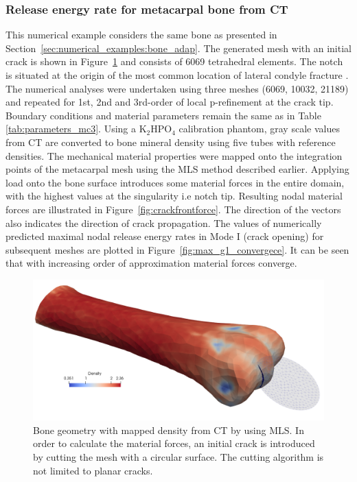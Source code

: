 \documentclass[11pt]{acmeArticle}
\numberwithin{equation}{section}
\begin{document}
\subsubsection{Release energy rate for metacarpal bone from CT}
This numerical example considers the same bone as presented in Section~\ref{sec:numerical_examples:bone_adap}. 
The generated mesh with an initial crack is shown in Figure~\ref{fig:bone_ct_mesh_cut} and consists of 6069 tetrahedral elements. 
The notch is situated at the origin of the most common location of lateral condyle fracture \citep{jacklin2012frequency}. 
The numerical analyses were undertaken using three meshes (6069, 10032, 21189) and repeated for 1st, 2nd and 3rd-order of local p-refinement at the crack tip. 
Boundary conditions and material parameters remain the same as in Table \ref{tab:parameters_mc3}. Using a $ \mathrm {K_2 HPO_4  }$ calibration phantom, gray scale values from CT are converted to bone mineral density using five tubes with reference densities. 
The mechanical material properties were mapped onto the integration points of the metacarpal mesh using the MLS method described earlier. 
Applying load onto the bone surface introduces some material forces in the entire domain, with the highest values at the singularity i.e notch tip. 
Resulting nodal material forces are illustrated in Figure~\ref{fig:crackfrontforce}. 
The direction of the vectors also indicates the direction of crack propagation.
The values of numerically predicted maximal nodal release energy rates in Mode I (crack opening) for subsequent meshes are plotted in Figure~\ref{fig:max_g1_convergece}. 
It can be seen that with increasing order of approximation material forces converge.
\begin{figure}
	\centering
	\includegraphics[width=0.5\linewidth]{Figures/bone_ct_mesh_cut.png}
	\caption{Bone geometry with mapped density from CT by using MLS. In order to calculate the material forces, an initial crack is introduced by cutting the mesh with a circular surface. The cutting algorithm is not limited to planar cracks. }
	\label{fig:bone_ct_mesh_cut}
\end{figure}
\end{document}
